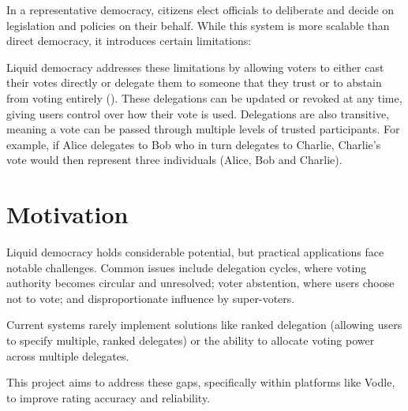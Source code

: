 In a representative democracy, citizens elect officials to deliberate and decide on legislation and policies on their behalf. While this system is more scalable than direct democracy, it introduces certain limitations:

Liquid democracy addresses these limitations by allowing voters to either cast their votes directly or delegate them to someone that they trust or to abstain from voting entirely (\cite{blum_liquid_2016}). These delegations can be updated or revoked at any time, giving users control over how their vote is used. Delegations are also transitive, meaning a vote can be passed through multiple levels of trusted participants. For example, if Alice delegates to Bob who in turn delegates to Charlie, Charlie's vote would then represent three individuals (Alice, Bob and Charlie).



\section{Motivation}
Liquid democracy holds considerable potential, but practical applications face notable challenges. Common issues include delegation cycles, where voting authority becomes circular and unresolved; voter abstention, where users choose not to vote; and disproportionate influence by super-voters.

Current systems rarely implement solutions like ranked delegation (allowing users to specify multiple, ranked delegates) or the ability to allocate voting power across multiple delegates.

This project aims to address these gaps, specifically within platforms like Vodle, to improve rating accuracy and reliability.

